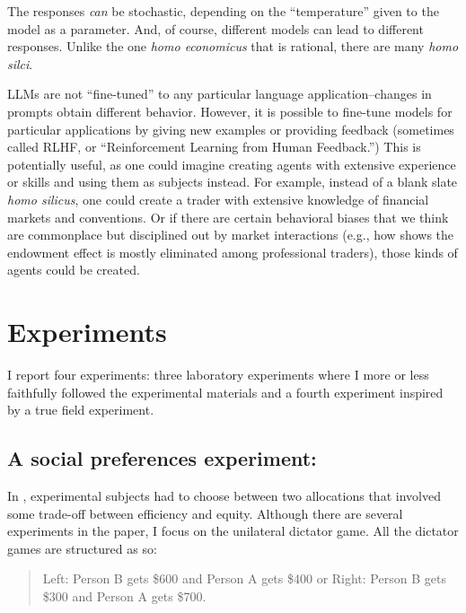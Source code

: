 \documentclass[11pt]{article}
\begin{document}
The responses \emph{can} be stochastic, depending on the ``temperature'' given to the model as a parameter.
And, of course, different models can lead to different responses.
Unlike the one \emph{homo economicus} that is rational, there are many \emph{homo silci}. 


LLMs are not ``fine-tuned'' to any particular language application--changes in prompts obtain different behavior.
However, it is possible to fine-tune models for particular applications by giving new examples or providing feedback (sometimes called RLHF, or ``Reinforcement Learning from Human Feedback.'')
This is potentially useful, as one could imagine creating agents with extensive experience or skills and using them as subjects instead.
For example, instead of a blank slate \emph{homo silicus}, one could create a trader with extensive knowledge of financial markets and conventions.
Or if there are certain behavioral biases that we think are commonplace but disciplined out by market interactions (e.g., how \cite{list2011} shows the endowment effect is mostly eliminated among professional traders), those kinds of agents could be created.

\section{Experiments}\label{sec:experiments}
I report four experiments: three laboratory experiments where I more or less faithfully followed the experimental materials and a fourth experiment inspired by a true field experiment.

\subsection{A social preferences experiment: \cite{charness2002understanding}} \label{sec:charness_rabin}

In \cite{charness2002understanding}, experimental subjects had to choose between two allocations that involved some trade-off between efficiency and equity.
Although there are several experiments in the paper, I focus on the unilateral dictator game.
All the dictator games are structured as so:
\begin{quote}
Left: Person B gets \$600 and Person A gets \$400 
or 
Right: Person B gets \$300 and Person A gets \$700.
\end{quote}
\end{document}
